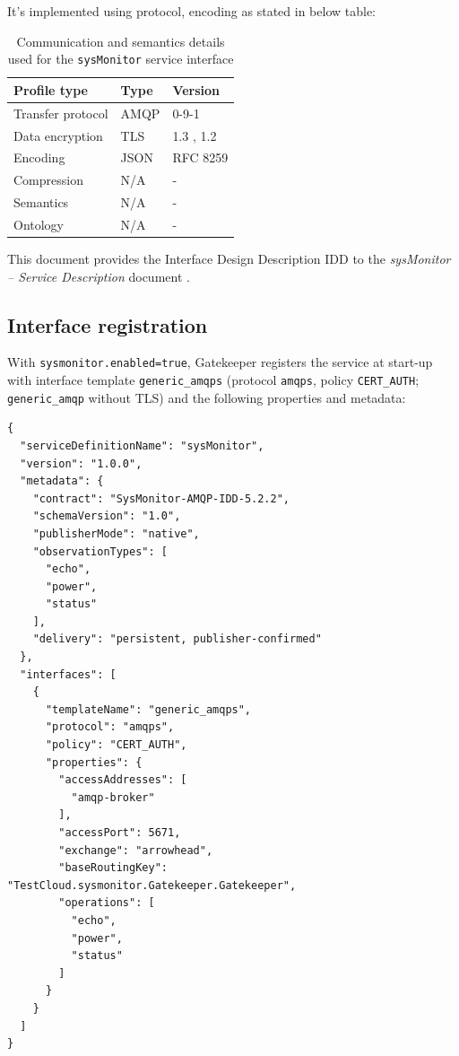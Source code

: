 \documentclass[a4paper]{arrowhead}
\begin{document}
It's implemented using protocol, encoding as stated in below table:
\begin{table}[ht!]
  \centering
  \begin{tabular}{|l|l|l|}
    \hline
    \rowcolor{gray!33} Profile type & Type & Version \\ \hline
    Transfer protocol & AMQP & 0-9-1 \cite{amqp091} \\ \hline
    Data encryption & TLS & 1.3 \cite{rfc8446}, 1.2 \cite{rfc5246} \\ \hline
    Encoding & JSON & RFC 8259 \cite{rfc8259} \\ \hline
    Compression & N/A & - \\ \hline
    Semantics & N/A & - \\ \hline
    Ontology & N/A & - \\ \hline
  \end{tabular}
  \caption{Communication and semantics details used for the \texttt{sysMonitor} service interface}
  \label{tab:comunication_semantics_profile}
\end{table}

This document provides the Interface Design Description IDD to the \textit{sysMonitor -- Service Description} document \cite{gk-sysMonitor-sd}.

\subsection{Interface registration}

With \texttt{sysmonitor.enabled=true}, Gatekeeper registers the service at start-up with interface template \texttt{generic\_\allowbreak{}amqps} (protocol \texttt{amqps}, policy \texttt{CERT\_\allowbreak{}AUTH}; \texttt{generic\_\allowbreak{}amqp} without TLS) and the following properties and metadata:

\begin{lstlisting}[caption={Registered service instance (TestCloud).}]
{
  "serviceDefinitionName": "sysMonitor",
  "version": "1.0.0",
  "metadata": {
    "contract": "SysMonitor-AMQP-IDD-5.2.2",
    "schemaVersion": "1.0",
    "publisherMode": "native",
    "observationTypes": [
      "echo",
      "power",
      "status"
    ],
    "delivery": "persistent, publisher-confirmed"
  },
  "interfaces": [
    {
      "templateName": "generic_amqps",
      "protocol": "amqps",
      "policy": "CERT_AUTH",
      "properties": {
        "accessAddresses": [
          "amqp-broker"
        ],
        "accessPort": 5671,
        "exchange": "arrowhead",
        "baseRoutingKey": "TestCloud.sysmonitor.Gatekeeper.Gatekeeper",
        "operations": [
          "echo",
          "power",
          "status"
        ]
      }
    }
  ]
}
\end{lstlisting}
\end{document}
